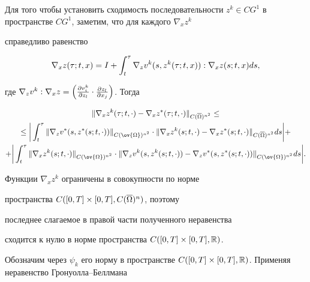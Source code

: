 \begin{pf}
Для того чтобы установить сходимость последовательности $z^k \in


CG^1$ в пространстве $CG^1$, заметим, что для каждого $\nabla_x {z^k}$


справедливо равенство


$$


\nabla_x z(\tau;t,x)=I+\intl{t}{\tau}\nabla_z


{v^k}(s,z^k(\tau;t,x)):\nabla_x z(s;t,x) ds,


$$


где $\nabla_z {v^k}:\nabla_x z=\left(\fr {v_i^k}{z_l}\cdot \fr


{z_l}{x_j}\right)$. Тогда


\begin{gather*}


\|\nabla_x {z^k}(\tau;t,\cdot)-\nabla_x {z^*}


(\tau;t,\cdot)\|_{C(\overline{\Om})^{n^2}} \le \\


%


\le\bigg|\intl{t}{\tau}\|\nabla_z


{v^*}(s,z^*(s;t,\cdot))\|_{C(\ov{\Om})^{n^2}}\cdot


\| \nabla_x {z^k}(s;t,\cdot)-\nabla_x {z^*} (s;t,\cdot


)\|_{C(\overline{\Om})^{n^2}} ds \bigg|+ \\


%


+\bigg|\intl{t}{\tau}\|\nabla_x {z^k}


(s;t,\cdot)\|_{C(\ov{\Om})^{n^2}}\cdot \|


\nabla_z {v^k} (s,z^k(s;t,\cdot))-\nabla_z {v^*}


(s,z^*(s;t,\cdot))\|_{C(\ov{\Om})^{n^2}}ds \bigg|.


\end{gather*}





Функции $\nabla_x {z^k}$ ограничены в совокупности по норме


пространства $C([0,T]\times[0,T], C(\overline{\Omega})^n)$, поэтому


последнее слагаемое в правой части полученного неравенства


сходится к нулю в норме пространства $C([0,T]\times[0,T],\Bbb R)$.


Обозначим через $\psi_k$ его норму в пространстве $C([0,T] \times


[0,T],\R)$. Применяя неравенство Гронуолла--Беллмана



\end{pf}
